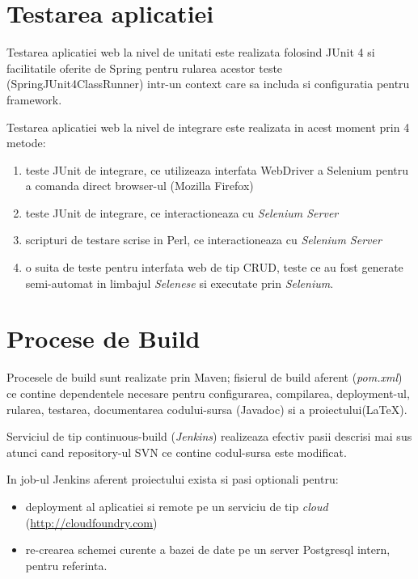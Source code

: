 \section{Testarea aplicatiei}

Testarea aplicatiei web la nivel de unitati este realizata folosind JUnit 4
si facilitatile oferite de Spring pentru rularea acestor teste (SpringJUnit4ClassRunner) 
intr-un context care sa includa si configuratia pentru framework.

Testarea aplicatiei web la nivel de integrare este realizata in acest moment prin 4 metode:
\begin{enumerate}
\item
teste JUnit de integrare, ce utilizeaza interfata WebDriver a Selenium pentru a comanda direct browser-ul (Mozilla Firefox)
\item
teste JUnit de integrare, ce interactioneaza cu \emph{Selenium Server}
\item
scripturi de testare scrise in Perl, ce interactioneaza cu \emph{Selenium Server}
\item
o suita de teste pentru interfata web de tip CRUD, 
teste ce au fost generate semi-automat in limbajul \emph{Selenese} 
si executate prin \emph{Selenium}.
\end{enumerate}

\section{Procese de Build}
Procesele de build sunt realizate prin Maven;
fisierul de build aferent (\emph{pom.xml})
ce contine dependentele necesare pentru configurarea, compilarea,
deployment-ul, rularea, testarea, documentarea codului-sursa (Javadoc) si a proiectului(LaTeX).

Serviciul de tip continuous-build (\emph{Jenkins}) 
realizeaza efectiv pasii descrisi mai sus 
atunci cand repository-ul SVN ce contine codul-sursa este modificat. 

In job-ul Jenkins aferent proiectului exista si pasi optionali pentru:
\begin{itemize}
\item
deployment al aplicatiei si remote pe un
serviciu de tip \emph{cloud} (\url{http://cloudfoundry.com}) 
\item
re-crearea schemei curente a bazei de date pe un server Postgresql intern,
pentru referinta.
\end{itemize}

